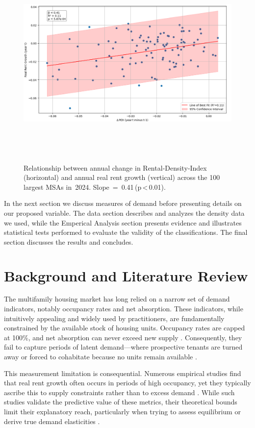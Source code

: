 \documentclass[APA,Times1COL]{WileyNJDv5} %
\begin{document}
\begin{figure}[h]
	\centerline{\includegraphics[width=\textwidth,height=25pc]{rdi_rent_growth_2024.png}}
	\caption{Relationship between annual change in Rental‑Density‑Index (horizontal) and annual real rent growth (vertical) across the 100 largest MSAs in 2024. Slope = 0.41 (p < 0.01).\label{fig:rdi_national}}
\end{figure}


In the next section we discuss measures of demand before presenting details on our proposed variable. The data section describes and analyzes the density data we used, while the Emperical Analysis section presents evidence and illustrates statistical tests performed to evaluate the validity of the classifications. The final section discusses the results and concludes. 

\section{Background and Literature Review}\label{sec2}

The multifamily housing market has long relied on a narrow set of demand indicators, notably occupancy rates and net absorption. These indicators, while intuitively appealing and widely used by practitioners, are fundamentally constrained by the available stock of housing units. Occupancy rates are capped at 100\%, and net absorption can never exceed new supply \cite{mueller1999real, gabriel2001rental}. Consequently, they fail to capture periods of latent demand---where prospective tenants are turned away or forced to cohabitate because no units remain available \cite{sirmans1991determinants, pyhrr1999real}.

This measurement limitation is consequential. Numerous empirical studies find that real rent growth often occurs in periods of high occupancy, yet they typically ascribe this to supply constraints rather than to excess demand \cite{goodman1992rental, wheaton1991realestate}. While such studies validate the predictive value of these metrics, their theoretical bounds limit their explanatory reach, particularly when trying to assess equilibrium or derive true demand elasticities \cite{pennington2021does, molloy2022housing}.
\end{document}
